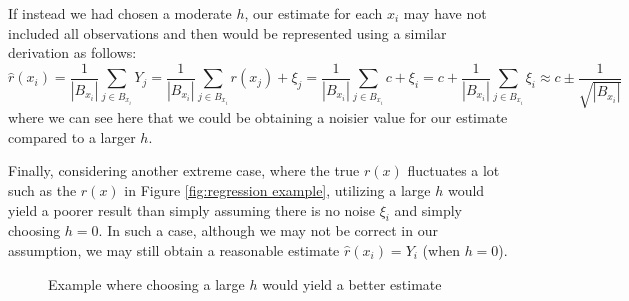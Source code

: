 If instead we had chosen a moderate $h$, our estimate for each $x_i$ may have not included all observations and then would be represented using a similar derivation as follows: \begin{equation}\hat{r}(x_i) = \frac{1}{|B_{x_i}|}\sum_{j \in B_{x_i}} Y_j = \frac{1}{|B_{x_i}|}\sum_{j \in B_{x_i}} r(x_j) + \xi_j =\frac{1}{|B_{x_i}|}\sum_{j \in B_{x_i}} c + \xi_i = c + \frac{1}{|B_{x_i}|}\sum_{j \in B_{x_i}} \xi_i \approx c \pm \frac{1}{\sqrt{|B_{x_i}|}}\end{equation} where we can see here that we could be obtaining a noisier value for our estimate compared to a larger $h$. 

Finally, considering another extreme case, where the true $r(x)$ fluctuates a lot such as the $r(x)$ in Figure \ref{fig:regression example}, utilizing a large $h$ would yield a poorer result than simply assuming there is no noise $\xi_i$ and simply choosing $h = 0$. In such a case, although we may not be correct in our assumption, we may still obtain a reasonable estimate $\hat{r}(x_i) = Y_i$ (when $h = 0$). 
\begin{figure}
	\begin{center}
		\caption{Example where choosing a large $h$ would yield a better estimate}
		\label{fig:choosing h large}
	\end{center}
\end{figure}